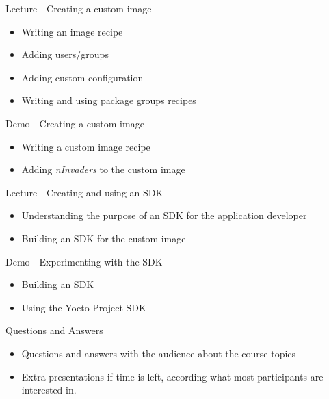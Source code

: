 \documentclass[a4paper,12pt,obeyspaces,spaces,hyphens]{article}
\begin{document}
\feagendatwocolumn
{Lecture - Creating a custom image}
{
  \begin{itemize}
  \item Writing an image recipe
  \item Adding users/groups
  \item Adding custom configuration
  \item Writing and using package groups recipes
  \end{itemize}
}
{Demo - Creating a custom image}
{
  \begin{itemize}
  \item Writing a custom image recipe
  \item Adding {\em nInvaders} to the custom image
  \end{itemize}
}
\feagendatwocolumn
{Lecture - Creating and using an SDK}
{
  \begin{itemize}
  \item Understanding the purpose of an SDK for the application
    developer
  \item Building an SDK for the custom image
  \end{itemize}
}
{Demo - Experimenting with the SDK}
{
  \begin{itemize}
  \item Building an SDK
  \item Using the Yocto Project SDK
  \end{itemize}
}

\feagendaonecolumn
{Questions and Answers}
{
  \begin{itemize}
  \item Questions and answers with the audience about the course topics
  \item Extra presentations if time is left, according what most
        participants are interested in.
  \end{itemize}
}
\end{document}
